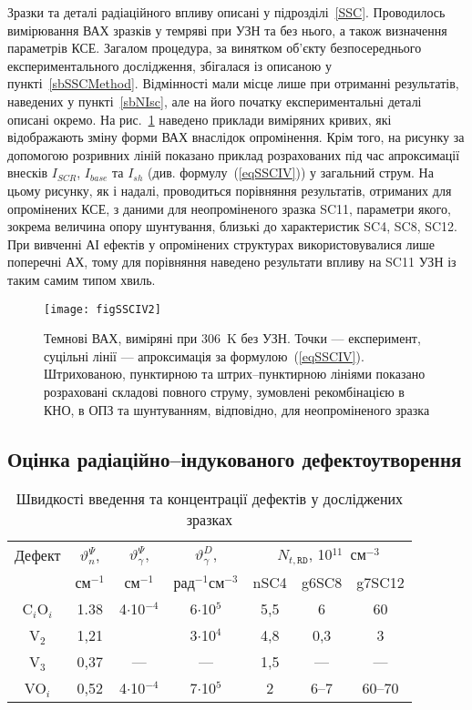 Зразки та деталі радіаційного впливу описані у підрозділі~\ref{SSC}.
Проводилось вимірювання ВАХ зразків у темряві при УЗН та без нього, а також визначення параметрів КСЕ.
Загалом процедура, за винятком об'єкту безпосереднього експериментального дослідження,
збігалася із описаною у пункті~\ref{sbSSCMethod}.
Відмінності мали місце лише при отриманні результатів, наведених у пункті~\ref{sbNIsc},
але на його початку експериментальні деталі описані окремо.
На рис.~\ref{figSSCIV2} наведено приклади виміряних кривих, які відображають
зміну форми ВАХ внаслідок опромінення.
Крім того, на рисунку за допомогою розривних ліній показано приклад розрахованих під час апроксимації внесків $I_{SCR}$, $I_{base}$ та $I_{sh}$
(див. формулу~(\ref{eqSSCIV})) у загальний струм.
На цьому рисунку, як і надалі, проводиться порівняння результатів,
отриманих для опромінених КСЕ, з даними для неопроміненого зразка SC11, параметри якого, зокрема величина  опору шунтування,
близькі до характеристик SC4, SC8, SC12.
При вивченні АІ ефектів у опромінених структурах використовувалися лише поперечні АХ,
тому для порівняння наведено результати впливу на SC11 УЗН із таким самим типом хвиль.

\begin{figure}
\center
\texttt{[image: figSSCIV2]}%
\caption{\label{figSSCIV2}
Темнові ВАХ,
виміряні при 306~K без УЗН.
Точки --- експеримент, суцільні лінії --- апроксимація за формулою~(\ref{eqSSCIV}).
Штрихованою, пунктирною та штрих--пунктирною лініями показано розраховані складові повного струму, зумовлені рекомбінацією в КНО, в ОПЗ та шунтуванням, відповідно,
для неопроміненого зразка
}%
\end{figure}



\subsection{Оцінка радіаційно--індукованого дефектоутворення\label{sbRadDefCreate}}

\begin{table}
\caption{\label{tabDefectNt}Швидкості введення та концентрації дефектів у досліджених зразках
}
\center
\begin{tabular}{|c|c|c|c|c|c|c|}
\hline
Дефект&$\vartheta_n^{\Psi}$,  &$\vartheta_\gamma^{\Psi}$,&$\vartheta_\gamma^D$,&\multicolumn{3}{c|}{$N_{t,\mathtt{RD}}$, 10$^{11}$~см$^{-3}$}\\
\cline{5-7}
&см$^{-1}$ \cite{Moll:PhD}&см$^{-1}$ \cite{gamma:Kolkr}&рад$^{-1}$см$^{-3}$ \cite{gamma:Stahl}&nSC4&g6SC8&g7SC12\\
\hline
C$_i$O$_i$&1.38&4$\cdot$10$^{-4}$&6$\cdot$10$^5$&5,5&6&60\\ \hline
V$_2$&1,21&&3$\cdot$10$^4$&4,8&0,3&3\\ \hline
V$_3$&0,37&---&---&1,5&---&---\\ \hline
VO$_i$&0,52&4$\cdot$10$^{-4}$&7$\cdot$10$^5$&2&6--7&60--70\\\hline
\end{tabular}
\end{table}

